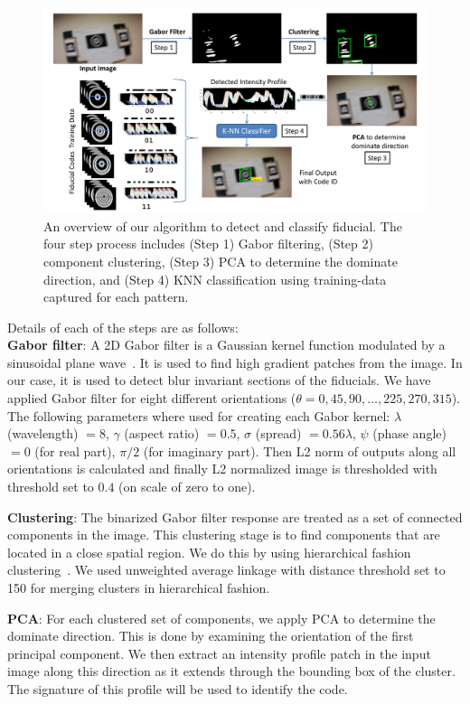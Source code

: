 \documentclass[runningheads]{llncs}
\begin{document}
\begin{figure}[ht!]
\includegraphics[width=\linewidth]{overall_flow.pdf}
\caption{An overview of our algorithm to detect and classify fiducial. 
The four step process includes (Step 1) Gabor filtering,
(Step 2) component clustering, (Step 3) PCA to determine the dominate direction, 
and (Step 4) KNN classification using training-data captured for each pattern.}
\label{fig:overall_flow}
\end{figure}

\noindent Details of each of the steps are as follows:\\
\noindent\textbf{Gabor filter}: A 2D Gabor filter is a Gaussian kernel function
modulated by a sinusoidal plane wave~\cite{Kruizinga:2002}. It is used to find
high gradient patches from the image. In our case, it is used to detect blur
invariant sections of the fiducials. We have applied Gabor filter for eight
different orientations ($\theta = 0, 45, 90, \ldots ,225, 270, 315$).  The
following parameters where used for creating each Gabor kernel: $\lambda$ (wavelength) $= 8$, $\gamma$
(aspect ratio) $= 0.5$, $\sigma$ (spread) $= 0.56\lambda$, $\psi$
(phase angle) $= 0$ (for real part), $\pi/2$ (for imaginary part).
Then L2 norm of outputs along all orientations is calculated and finally L2
normalized image is thresholded with threshold set to $0.4$ (on scale of zero to
one).

\noindent\textbf{Clustering}: The binarized Gabor filter response are
treated as a set of connected components in the image.   This clustering
stage is to find components that are located in a close spatial region.  We do
this by using hierarchical fashion clustering~\cite{ALGLIB}. We used unweighted
average linkage with distance threshold set to 150 for merging clusters in
hierarchical fashion.

\noindent\textbf{PCA}: For each clustered set of components, we apply 
PCA to determine the dominate direction.  This is done by examining the
orientation of the first principal component.  We then extract an intensity
profile patch in the input image along this direction as it extends through the
bounding box of the cluster. The signature of this profile will be used to
identify the code.
\end{document}

